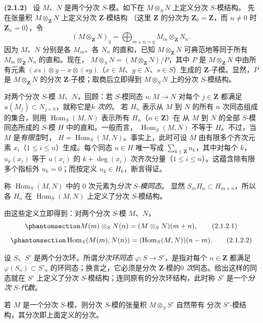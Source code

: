 \documentclass[UTF8,fontset=none,11pt,oneside,openany]{ctexbook}
\newenvironment{env}[1][]{\par\medskip\noindent\textbf{(#1)}\ }{\par}
\newcommand{\oldpage}[2][]{%
  \hypertarget{ega-source-page-#1-#2}{}%
  \marginnote{\scriptsize\textbf{#1}~|~#2}\ignorespaces}
\let\EGAOriginalLabel\label
\renewcommand{\label}[1]{\phantomsection\EGAOriginalLabel{#1}}
\begin{document}
\begin{env}[2.1.2]
\label{II.2.1.2-zh}
设 $M$、$N$ 是两个分次 $S$-模。如下在 $M\otimes_S N$ 上定义分次 $S$-模结构。
先在张量积 $M\otimes_{\mathbf{Z}}N$ 上定义分次 $\mathbf{Z}$-模结构
（这里 $\mathbf{Z}$ 的分次为
$\mathbf{Z}_0=\mathbf{Z}$，而 $n\ne0$ 时 $\mathbf{Z}_n=0$），令
\[
  (M\otimes_{\mathbf{Z}}N)_q
  =\bigoplus_{m+n=q}M_m\otimes_{\mathbf{Z}}N_n.
\]
因为 $M$、$N$ 分别是各 $M_m$、各 $N_n$ 的直和，已知
$M\otimes_{\mathbf{Z}}N$ 可典范地等同于所有
$M_m\otimes_{\mathbf{Z}}N_n$ 的直和。现在，
$M\otimes_S N=(M\otimes_{\mathbf{Z}}N)/P$，其中 $P$ 是
$M\otimes_{\mathbf{Z}}N$ 中由所有元素
$(xs)\otimes y-x\otimes(sy)$（$x\in M$、$y\in N$、$s\in S$）生成的
$\mathbf{Z}$-子模。显然，$P$ 是 $M\otimes_{\mathbf{Z}}N$ 的分次
$\mathbf{Z}$-子模；取商后立即得到 $M\otimes_S N$ 上的分次 $S$-模结构。

对两个分次 $S$-模 $M$、$N$，回顾：若 $S$-模同态 $u:M\to N$ 对每个
$j\in\mathbf{Z}$ 都满足 $u(M_j)\subset N_{j+k}$，就称它是\emph{$k$ 次的}。
若 $H_n$ 表示从 $M$ 到 $N$ 的所有 $n$ 次同态组成的集合，则用
$\operatorname{Hom}_S(M,N)$ 表示所有 $H_n$（$n\in\mathbf{Z}$）在
从 $M$ 到 $N$ 的全部 $S$-模同态所成的 $S$-模 $H$ 中的直和。一般而言，
$\operatorname{Hom}_S(M,N)$ 不等于 $H$。不过，当 $M$ 是\emph{有限型}时，
$H=\operatorname{Hom}_S(M,N)$。事实上，此时可设 $M$ 由有限多个齐次元素
$x_i$（$1\leq i\leq n$）生成。每个同态 $u\in H$ 唯一写成
$\sum_{k\in\mathbf{Z}}u_k$，其中对每个 $k$，$u_k(x_i)$ 等于 $u(x_i)$ 的
$k+\deg(x_i)$ 次齐次分量（$1\leq i\leq n$）。这蕴含除有限多个指标外
$u_k=0$；而按定义 $u_k\in H_k$，断言得证。

称 $\operatorname{Hom}_S(M,N)$ 中的 $0$ 次元素为\emph{分次 $S$-模同态}。
显然 $S_mH_n\subset H_{m+n}$，所以各 $H_n$ 在
$\operatorname{Hom}_S(M,N)$ 上定义了分次 $S$-模结构。

由这些定义立即得到：对两个分次 $S$-模 $M$、$N$，
\[
  \label{II.2.1.2.1-zh}
  M(m)\otimes_S N(n)=(M\otimes_S N)(m+n),
  \tag{2.1.2.1}
\]
\[
  \label{II.2.1.2.2-zh}
  \operatorname{Hom}_S(M(m),N(n))
  =(\operatorname{Hom}_S(M,N))(n-m).
  \tag{2.1.2.2}
\]

\oldpage[II]{21}
设 $S$、$S'$ 是两个分次环。所谓\emph{分次环同态}
$\varphi:S\to S'$，是指对每个 $n\in\mathbf{Z}$ 都满足
$\varphi(S_n)\subset S'_n$ 的环同态；换言之，它必须是分次
$\mathbf{Z}$-模的\emph{$0$ 次}同态。给出这样的同态就在 $S'$ 上定义了分次
$S$-模结构；连同原有的分次环结构，此时称 $S'$ 是一个\emph{分次 $S$-代数}。

若 $M$ 是一个分次 $S$-模，则分次 $S$-模的张量积 $M\otimes_S S'$ 自然带有
分次 $S'$-模结构，其分次即上面定义的分次。
\end{env}
\end{document}
